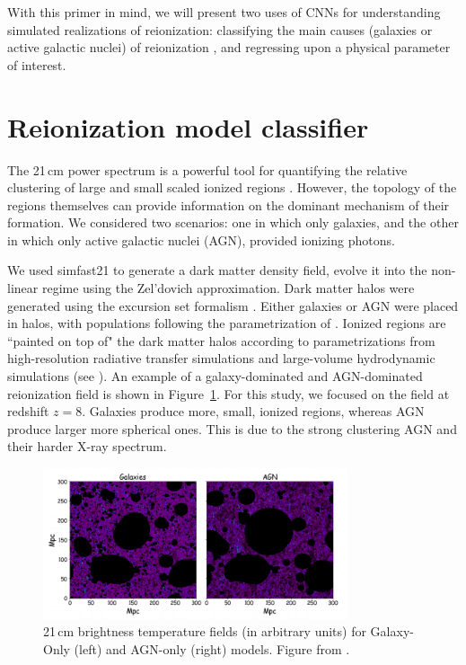 With this primer in mind, we will present two uses of CNNs for understanding simulated realizations of reionization: classifying the main causes (galaxies or active galactic nuclei) of reionization \citep{Sultan.18}, and regressing upon a physical parameter of interest.

\section{Reionization model classifier}

The 21\,cm power spectrum is a powerful tool for quantifying the relative clustering of large and small scaled ionized regions \citep{Hassan.17}. However, the topology of the regions themselves can provide information on the dominant mechanism of their formation. We considered two scenarios: one in which only galaxies, and the other in which only active galactic nuclei (AGN), provided ionizing photons. 

We used {\sc simfast21} \citep{Santos.10, Hassan.17.1} to generate a dark matter density field, evolve it into the non-linear regime using the Zel'dovich approximation. Dark matter halos were generated using the excursion set formalism \citep{Bond.91}. Either galaxies or AGN were placed in halos, with populations following the parametrization of \cite{Hassan.16}. Ionized regions are ``painted on top of" the dark matter halos according to parametrizations from high-resolution radiative transfer simulations and large-volume hydrodynamic simulations (see \cite{Hassan.16, Hassan.18}). An example of a galaxy-dominated and AGN-dominated reionization field is shown in Figure~\ref{fig:hassan-fields}. For this study, we focused on the field at redshift $z=8$. Galaxies produce more, small, ionized regions, whereas AGN produce larger more spherical ones. This is due to the strong clustering AGN and their harder X-ray spectrum.

\begin{figure}
\centering
\includegraphics[width=0.8\textwidth]{chapters/hera_ml/figures/hassan-field.png}
\caption[21\,cm brightness temperature fields for Galaxy-Only and AGN-only models.]{21\,cm brightness temperature fields (in arbitrary units) for Galaxy-Only (left) and AGN-only (right) models. Figure from \cite{Hassan.18}.}
\label{fig:hassan-fields}
\end{figure}

